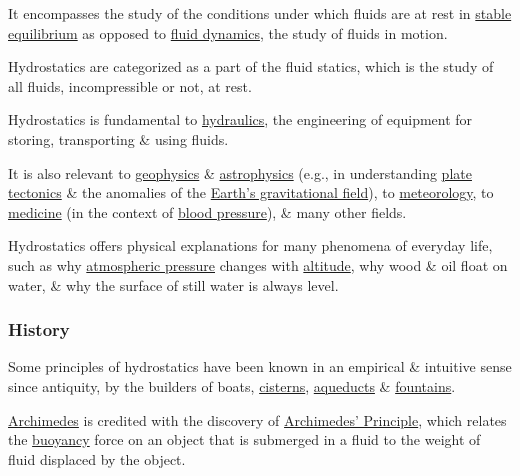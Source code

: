 \documentclass{article}
\begin{document}
%
It encompasses the study of the conditions under which fluids are at rest in \href{https://en.wikipedia.org/wiki/Mechanical_equilibrium}{stable equilibrium} as opposed to \href{https://en.wikipedia.org/wiki/Fluid_dynamics}{fluid dynamics}, the study of fluids in motion.

Hydrostatics are categorized as a part of the fluid statics, which is the study of all fluids, incompressible or not, at rest.

%
Hydrostatics is fundamental to \href{https://en.wikipedia.org/wiki/Hydraulics}{hydraulics}, the engineering of equipment for storing, transporting \& using fluids.

It is also relevant to \href{https://en.wikipedia.org/wiki/Geophysics}{geophysics} \& \href{https://en.wikipedia.org/wiki/Astrophysics}{astrophysics} (e.g., in understanding \href{https://en.wikipedia.org/wiki/Plate_tectonics}{plate tectonics} \& the anomalies of the \href{https://en.wikipedia.org/wiki/Gravity_of_Earth}{Earth's gravitational field}), to \href{https://en.wikipedia.org/wiki/Meteorology}{meteorology}, to \href{https://en.wikipedia.org/wiki/Medicine}{medicine} (in the context of \href{https://en.wikipedia.org/wiki/Blood_pressure}{blood pressure}), \& many other fields.

%
Hydrostatics offers physical explanations for many phenomena of everyday life, such as why \href{https://en.wikipedia.org/wiki/Atmospheric_pressure}{atmospheric pressure} changes with \href{https://en.wikipedia.org/wiki/Altitude}{altitude}, why wood \& oil float on water, \& why the surface of still water is always level.

\subsubsection{History}
Some principles of hydrostatics have been known in an empirical \& intuitive sense since antiquity, by the builders of boats, \href{https://en.wikipedia.org/wiki/Cistern}{cisterns}, \href{https://en.wikipedia.org/wiki/Aqueduct_(water_supply)}{aqueducts} \& \href{https://en.wikipedia.org/wiki/Fountain}{fountains}.

\href{https://en.wikipedia.org/wiki/Archimedes}{Archimedes} is credited with the discovery of \href{https://en.wikipedia.org/wiki/Archimedes'_Principle}{Archimedes' Principle}, which relates the \href{https://en.wikipedia.org/wiki/Buoyancy}{buoyancy} force on an object that is submerged in a fluid to the weight of fluid displaced by the object.
\end{document}
